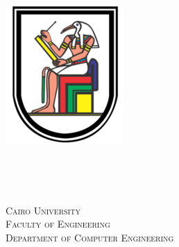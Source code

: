 \documentclass[a4paper,12pt]{article}
\begin{document}
\pagecolor{ForestGreen}\afterpage{\nopagecolor}
\begin{titlepage}
\newcommand{\HRule}{\rule{\linewidth}{0.5mm}} %
\center %
 
\begin{minipage}{0.45\textwidth}
\begin{flushleft} \large
\includegraphics[scale=0.4]{images/uni-logo.png}\\
\end{flushleft}
\end{minipage}
~
\begin{minipage}{0.45\textwidth}
\begin{flushright}
\end{flushright}
\end{minipage}\\[0.1cm]

\begin{minipage}{0.7\textwidth}
\begin{flushleft}
\hspace*{-2.0cm}
\textsc{Cairo University}\\[0.15cm]
\hspace*{-2.0cm}
\textsc{Faculty of Engineering} \\[0.15cm]
\hspace*{-2.0cm}
\textsc{Department of Computer Engineering} \\
\end{flushleft}
\end{minipage}
~
\begin{minipage}{0.45\textwidth}
\begin{flushright}
\end{flushright}
\end{minipage}\\[1cm]


\end{titlepage}
\end{document}
